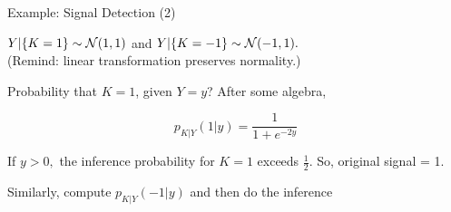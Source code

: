 \begin{frame}{Example: Signal Detection (2)}

\plitemsep 0.01in
\bci

\item<1-> $Y|\{K=1\} \sim \mathcal N(1,1)$ and $Y|\{K=-1\} \sim \mathcal N(-1,1).$ \\
(Remind: linear transformation preserves normality.)

\item<4-> Probability that $K=1$, given $Y=y$? After some algebra,

{
$$
p_{K|Y}(1|y) = \frac{1}{1+ e^{-2y}}
$$
\vspace{-0.3cm}
\bci
\item<6->  If $y >0,$ the inference probability for $K=1$ exceeds $\frac{1}{2}$. So, original signal = 1.
\item<7->  Similarly, compute $p_{K|Y}(-1|y)$ and then do the inference
\eci


}
{
\centering
{}
}

\eci

\end{frame}


